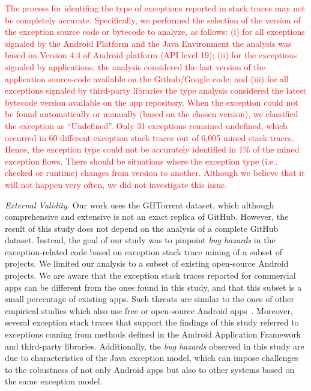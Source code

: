 \textcolor{red}{The process for
identifing the type of exceptions reported in stack traces may not be completely
accurate.
Specifically, we performed the selection of the version of the exception source code or bytecode
to analyze, as follows: (i) for all exceptions signaled by the Android Platform
and the Java Environment the analysis was based on Version 4.4 of Android platform (API level 19);  (ii)
for the exceptions signaled by applications, the analysis considered
the last version of the application source-code available on the Github/Google code; and (iii)
for all exceptions signaled by third-party libraries the type analysis
considered the latest bytecode version available on the app repository.
When the exception could not be found automatically or manually (based on the chosen version),
we classified the exception as ``Undefined''.  Only 31 exceptions
remained undefined, which occurred in 60 different exception stack traces out of 6,005 mined stack traces.
Hence, the exception type could not be accurately identified in 1\% of the mined
exception flows.
There should be situations where the exception type (i.e., checked or runtime) changes from version to another.
Although we believe that it will not happen very often, we did not investigate
this issue.}


\emph{External Validity.} Our work uses the GHTorrent dataset, which although
comprehensive and extensive is not an exact replica of GitHub.
However, the result of this study does not depend on the analysis of
a complete GitHub dataset. Instead, the goal of our study was to
pinpoint \emph{bug hazards} in the exception-related code based on
exception stack trace mining of a subset of projects.
We limited our analysis to a subset of existing open-source Android projects.
We are aware that the exception stack traces reported
for commercial apps can be different from the ones found in this study, and that
this subset is a small percentage of existing apps.
Such threats are similar to the ones of other empirical studies
which also use free or open-source Android apps~\cite{Linar13,McDon13,Ruiz12}.
Moreover, several exception stack traces that support the findings of this study
referred to exceptions coming from methods defined in the Android Application Framework
and third-party libraries.  Additionally,  the \emph{bug hazards} observed in this study are due to
characteristics of the Java exception model, which can impose challenges to
the robustness of not only Android apps but also to other systems
 based on the same exception model.

